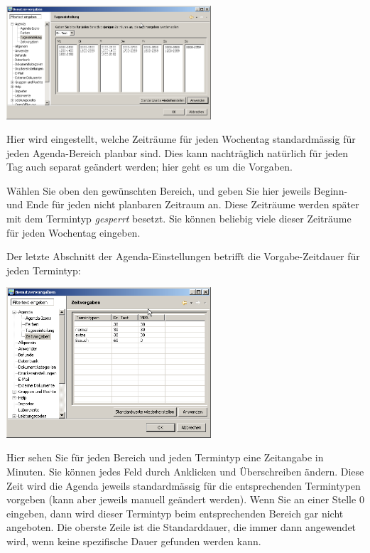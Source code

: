 \includegraphics[width=3in]{images/settings5.png}

Hier wird eingestellt, welche Zeiträume für jeden Wochentag standardmässig für jeden Agenda-Bereich planbar sind. Dies kann
nachträglich natürlich für jeden Tag auch separat geändert werden; hier geht es um die Vorgaben.

Wählen Sie oben den gewünschten Bereich, und geben Sie hier jeweils Beginn- und Ende für jeden nicht
planbaren Zeitraum an. Diese Zeiträume werden später mit dem Termintyp \textit{gesperrt} besetzt. Sie können beliebig viele dieser
Zeiträume für jeden Wochentag  eingeben.

Der letzte Abschnitt der Agenda-Einstellungen betrifft die Vorgabe-Zeitdauer für jeden Termintyp:

\includegraphics[width=3in]{images/settings6.png}

Hier sehen Sie für jeden Bereich und jeden Termintyp eine Zeitangabe in Minuten.
Sie können jedes Feld durch Anklicken und Überschreiben ändern. Diese Zeit wird die Agenda jeweils standardmässig für die entsprechenden
 Termintypen vorgeben (kann aber jeweils manuell geändert werden). Wenn Sie an einer Stelle 0 eingeben, dann wird dieser Termintyp beim
 entsprechenden Bereich gar nicht angeboten.
Die oberste Zeile ist die Standarddauer, die immer dann angewendet wird, wenn keine spezifische Dauer  gefunden werden kann.

